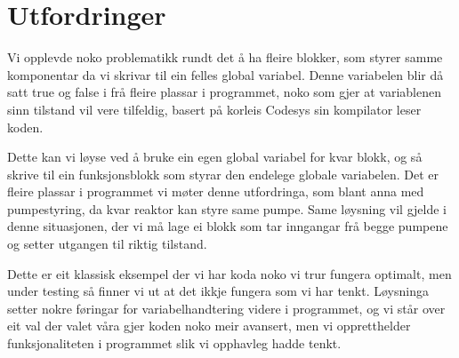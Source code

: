 \section{Utfordringer}
\thispagestyle{fancy}

Vi opplevde noko problematikk rundt det å ha fleire blokker, som styrer samme komponentar da vi skrivar til ein felles global variabel.
Denne variabelen blir då satt true og false i frå fleire plassar i programmet, noko som gjer at variablenen sinn tilstand vil vere tilfeldig, basert på korleis Codesys sin kompilator leser koden.

Dette kan vi løyse ved å bruke ein egen global variabel for kvar blokk, og så skrive til ein funksjonsblokk som styrar den endelege globale variabelen.
Det er fleire plassar i programmet vi møter denne utfordringa, som blant anna med pumpestyring, da kvar reaktor kan styre same pumpe.
Same løysning vil gjelde i denne situasjonen, der vi må lage ei blokk som tar inngangar frå begge pumpene og setter utgangen til riktig tilstand.  

Dette er eit klassisk eksempel der vi har koda noko vi trur fungera optimalt, men under testing så finner vi ut at det ikkje fungera som vi har tenkt.
Løysninga setter nokre føringar for variabelhandtering videre i programmet, og vi står over eit val der valet våra gjer koden noko meir avansert, men vi oppretthelder funksjonaliteten i programmet slik vi opphavleg hadde tenkt.
